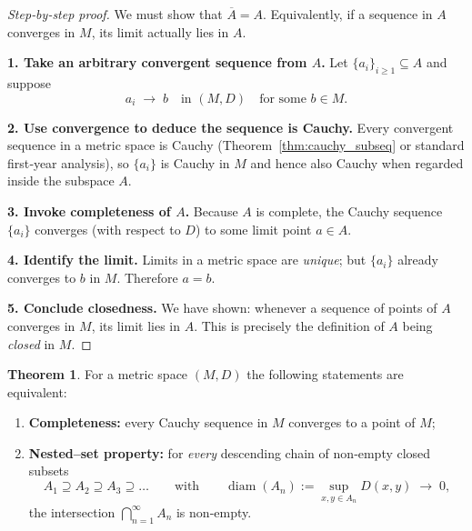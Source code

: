 \documentclass[12pt]{article}
\DeclareMathOperator{\diam}{diam}
\theoremstyle{definition} %
\newtheorem{theorem}{Theorem}
\theoremstyle{plain} %
\begin{document}
\begin{proof}[Step‑by‑step proof]
  We must show that \(\overline{A}=A\).  
  Equivalently, if a sequence in \(A\) converges in \(M\), its limit
  actually lies in \(A\).

  \smallskip
  \textbf{1.  Take an arbitrary convergent sequence from \(A\).}  
  Let \(\{a_i\}_{i\ge1}\subseteq A\) and suppose
  \[
      a_i \;\longrightarrow\; b
      \quad\text{in } (M,D)
      \quad\text{for some }b\in M.
  \]

  \smallskip
  \textbf{2.  Use convergence to deduce the sequence is Cauchy.}  
  Every convergent sequence in a metric space is Cauchy
  (Theorem \ref{thm:cauchy_subseq} or standard first‑year analysis),
  so \(\{a_i\}\) is Cauchy in \(M\) and hence also Cauchy when regarded
  inside the subspace \(A\).

  \smallskip
  \textbf{3.  Invoke completeness of \(A\).}  
  Because \(A\) is complete, the Cauchy sequence \(\{a_i\}\)
  converges (with respect to \(D\)) to some limit point \(a\in A\).

  \smallskip
  \textbf{4.  Identify the limit.}  
  Limits in a metric space are \emph{unique}; but \(\{a_i\}\) already
  converges to \(b\) in \(M\).
  Therefore \(a=b\).

  \smallskip
  \textbf{5.  Conclude closedness.}  
  We have shown: whenever a sequence of points of \(A\) converges in \(M\),
  its limit lies in \(A\).  
  This is precisely the definition of \(A\) being \emph{closed} in \(M\).
\end{proof}
\begin{theorem}\label{thm:nested_diam}
  For a metric space $(M,D)$ the following statements are equivalent:
  \begin{enumerate}[label=\textup{(\alph*)}]
      \item \textbf{Completeness:} every Cauchy sequence in $M$ converges to a
            point of $M$;
      \item \textbf{Nested–set property:} for \emph{every} descending chain of
            non‑empty closed subsets
            \[
                A_1 \supseteq A_2 \supseteq A_3 \supseteq \dots
                \qquad\text{with}\qquad
                \diam(A_n):=\sup_{x,y\in A_n}D(x,y)\;\longrightarrow\;0,
            \]
            the intersection $\displaystyle\bigcap_{n=1}^{\infty}A_n$ is
            non‑empty.
  \end{enumerate}
\end{theorem}
\end{document}
